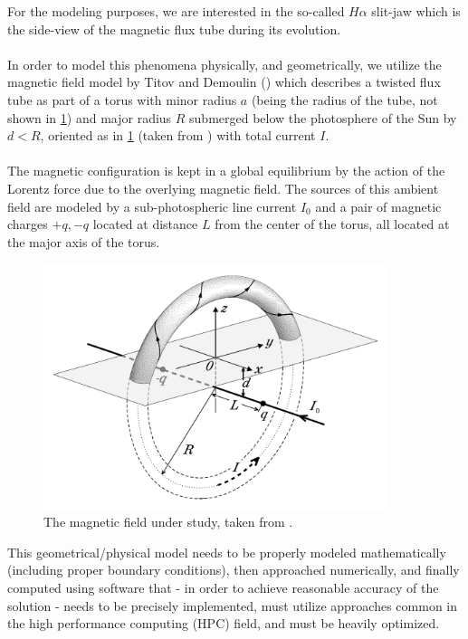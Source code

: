 For the modeling purposes, we are interested in the so-called $H\alpha$ slit-jaw which is the side-view of the magnetic flux tube during its evolution.
\paragraph{}
In order to model this phenomena physically, and geometrically, we utilize the magnetic field model by Titov and Demoulin (\cite{td}) which describes a twisted flux tube as part of a torus with minor radius $a$ (being the radius of the tube, not shown in \cref{figure:td}) and major radius $R$ submerged below the photosphere of the Sun by $d < R$, oriented as in \cref{figure:td} (taken from \cite{td}) with total current $I$.
\paragraph{}
The magnetic configuration is kept in a global equilibrium by the action of the Lorentz force due to the overlying magnetic field. The sources of this ambient field are modeled by a sub-photospheric line current $I_0$ and a pair of magnetic charges $+q, -q$ located at distance $L$ from the center of the torus, all located at the major axis of the torus.

\begin{figure}[H]
	\begin{center}
		\includegraphics[width=0.9\textwidth]{img/td-setup/fromTD.jpg}
	\caption{The magnetic field under study, taken from \cite{td}.}
	\label{figure:td}
	\end{center}
\end{figure}

This geometrical/physical model needs to be properly modeled mathematically (including proper boundary conditions), then approached numerically, and finally computed using software that - in order to achieve reasonable accuracy of the solution - needs to be precisely implemented, must utilize approaches common in the high performance computing (HPC) field, and must be heavily optimized.
